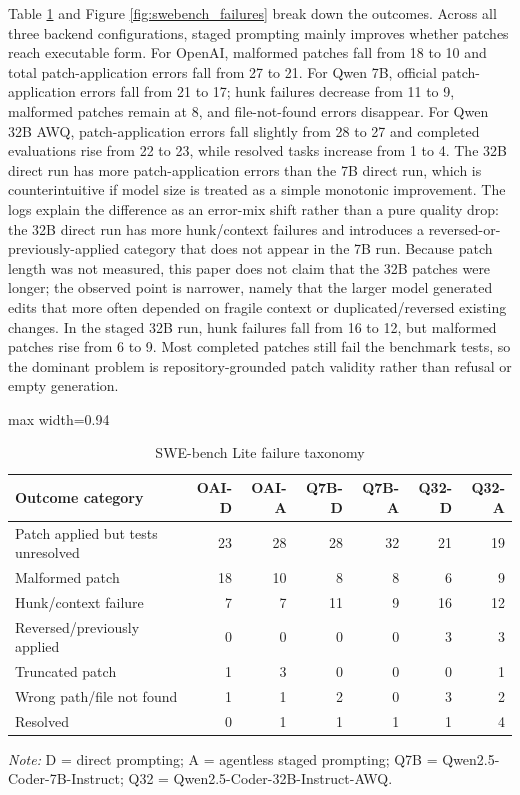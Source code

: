 \documentclass[preprint,12pt]{elsarticle}
\begin{document}
Table \ref{tab:swebench_failures} and Figure \ref{fig:swebench_failures} break down the outcomes. Across all three backend configurations, staged prompting mainly improves whether patches reach executable form. For OpenAI, malformed patches fall from 18 to 10 and total patch-application errors fall from 27 to 21. For Qwen 7B, official patch-application errors fall from 21 to 17; hunk failures decrease from 11 to 9, malformed patches remain at 8, and file-not-found errors disappear. For Qwen 32B AWQ, patch-application errors fall slightly from 28 to 27 and completed evaluations rise from 22 to 23, while resolved tasks increase from 1 to 4. The 32B direct run has more patch-application errors than the 7B direct run, which is counterintuitive if model size is treated as a simple monotonic improvement. The logs explain the difference as an error-mix shift rather than a pure quality drop: the 32B direct run has more hunk/context failures and introduces a reversed-or-previously-applied category that does not appear in the 7B run. Because patch length was not measured, this paper does not claim that the 32B patches were longer; the observed point is narrower, namely that the larger model generated edits that more often depended on fragile context or duplicated/reversed existing changes. In the staged 32B run, hunk failures fall from 16 to 12, but malformed patches rise from 6 to 9. Most completed patches still fail the benchmark tests, so the dominant problem is repository-grounded patch validity rather than refusal or empty generation.

\begin{table}[htbp]
\centering
\caption{SWE-bench Lite failure taxonomy}
\label{tab:swebench_failures}
\footnotesize
\begin{adjustbox}{max width=0.94\linewidth}
\begin{tabular}{lrrrrrr}
\toprule
Outcome category & OAI-D & OAI-A & Q7B-D & Q7B-A & Q32-D & Q32-A \\
\midrule
Patch applied but tests unresolved & 23 & 28 & 28 & 32 & 21 & 19 \\
Malformed patch & 18 & 10 & 8 & 8 & 6 & 9 \\
Hunk/context failure & 7 & 7 & 11 & 9 & 16 & 12 \\
Reversed/previously applied & 0 & 0 & 0 & 0 & 3 & 3 \\
Truncated patch & 1 & 3 & 0 & 0 & 0 & 1 \\
Wrong path/file not found & 1 & 1 & 2 & 0 & 3 & 2 \\
Resolved & 0 & 1 & 1 & 1 & 1 & 4 \\
\bottomrule
\end{tabular}
\end{adjustbox}
\begin{minipage}{0.92\linewidth}
\footnotesize\textit{Note:} D = direct prompting; A = agentless staged prompting; Q7B = Qwen2.5-Coder-7B-Instruct; Q32 = Qwen2.5-Coder-32B-Instruct-AWQ.
\end{minipage}
\end{table}
\end{document}
